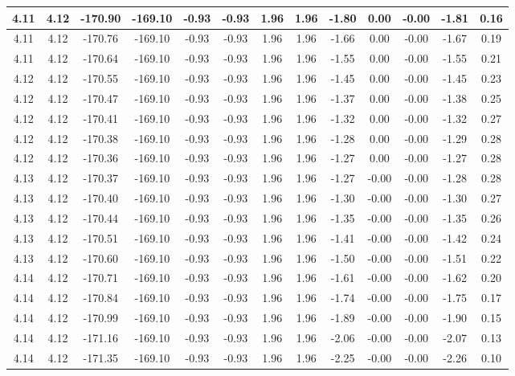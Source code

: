 \begin{table}[htbp]
\begin{adjustbox}{angle=90}
\begin{tabular}{|c|c|c|c|c|c|c|c|c|c|c|c|c|}
 4.11 & 4.12 & -170.90 & -169.10 & -0.93 & -0.93 & 1.96 & 1.96 & -1.80 & 0.00 & -0.00 & -1.81 & 0.16\\ \hline
 4.11 & 4.12 & -170.76 & -169.10 & -0.93 & -0.93 & 1.96 & 1.96 & -1.66 & 0.00 & -0.00 & -1.67 & 0.19\\ \hline
 4.11 & 4.12 & -170.64 & -169.10 & -0.93 & -0.93 & 1.96 & 1.96 & -1.55 & 0.00 & -0.00 & -1.55 & 0.21\\ \hline
 4.12 & 4.12 & -170.55 & -169.10 & -0.93 & -0.93 & 1.96 & 1.96 & -1.45 & 0.00 & -0.00 & -1.45 & 0.23\\ \hline
 4.12 & 4.12 & -170.47 & -169.10 & -0.93 & -0.93 & 1.96 & 1.96 & -1.37 & 0.00 & -0.00 & -1.38 & 0.25\\ \hline
 4.12 & 4.12 & -170.41 & -169.10 & -0.93 & -0.93 & 1.96 & 1.96 & -1.32 & 0.00 & -0.00 & -1.32 & 0.27\\ \hline
 4.12 & 4.12 & -170.38 & -169.10 & -0.93 & -0.93 & 1.96 & 1.96 & -1.28 & 0.00 & -0.00 & -1.29 & 0.28\\ \hline
 4.12 & 4.12 & -170.36 & -169.10 & -0.93 & -0.93 & 1.96 & 1.96 & -1.27 & 0.00 & -0.00 & -1.27 & 0.28\\ \hline
 4.13 & 4.12 & -170.37 & -169.10 & -0.93 & -0.93 & 1.96 & 1.96 & -1.27 & -0.00 & -0.00 & -1.28 & 0.28\\ \hline
 4.13 & 4.12 & -170.40 & -169.10 & -0.93 & -0.93 & 1.96 & 1.96 & -1.30 & -0.00 & -0.00 & -1.30 & 0.27\\ \hline
 4.13 & 4.12 & -170.44 & -169.10 & -0.93 & -0.93 & 1.96 & 1.96 & -1.35 & -0.00 & -0.00 & -1.35 & 0.26\\ \hline
 4.13 & 4.12 & -170.51 & -169.10 & -0.93 & -0.93 & 1.96 & 1.96 & -1.41 & -0.00 & -0.00 & -1.42 & 0.24\\ \hline
 4.13 & 4.12 & -170.60 & -169.10 & -0.93 & -0.93 & 1.96 & 1.96 & -1.50 & -0.00 & -0.00 & -1.51 & 0.22\\ \hline
 4.14 & 4.12 & -170.71 & -169.10 & -0.93 & -0.93 & 1.96 & 1.96 & -1.61 & -0.00 & -0.00 & -1.62 & 0.20\\ \hline
 4.14 & 4.12 & -170.84 & -169.10 & -0.93 & -0.93 & 1.96 & 1.96 & -1.74 & -0.00 & -0.00 & -1.75 & 0.17\\ \hline
 4.14 & 4.12 & -170.99 & -169.10 & -0.93 & -0.93 & 1.96 & 1.96 & -1.89 & -0.00 & -0.00 & -1.90 & 0.15\\ \hline
 4.14 & 4.12 & -171.16 & -169.10 & -0.93 & -0.93 & 1.96 & 1.96 & -2.06 & -0.00 & -0.00 & -2.07 & 0.13\\ \hline
 4.14 & 4.12 & -171.35 & -169.10 & -0.93 & -0.93 & 1.96 & 1.96 & -2.25 & -0.00 & -0.00 & -2.26 & 0.10\\ \hline

\end{tabular}
\end{adjustbox}
\end{table}
